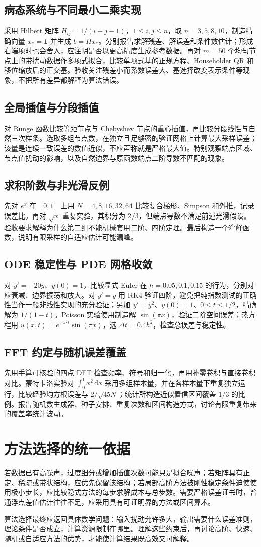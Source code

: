 \subsection{病态系统与不同最小二乘实现}
采用 Hilbert 矩阵 $H_{ij}=1/(i+j-1)$，$1\le i,j\le n$，取 $n=3,5,8,10$，制造精确向量 $x_*=\boldsymbol1$ 并生成 $b=Hx_*$。分别报告求解残差、解误差和条件数估计；形成右端项时也会舍入，应注明是否以更高精度生成参考数据。再对 $m=50$ 个均匀节点上的带扰动数据作多项式拟合，比较单项式基的正规方程、Householder QR 和移位缩放后的正交基。验收关注残差小而系数误差大、基选择改变表示条件等现象，不把所有差异都解释为算法错误。

\subsection{全局插值与分段插值}
对 Runge 函数比较等距节点与 Chebyshev 节点的重心插值，再比较分段线性与自然三次样条。选取多组节点数，在独立且足够密的验证网格上计算最大采样误差；该量是连续一致误差的数值近似，不应声称就是严格最大值。特别观察端点区域、节点值扰动的影响，以及自然边界与原函数端点二阶导数不匹配的现象。

\subsection{求积阶数与非光滑反例}
先对 $e^x$ 在 $[0,1]$ 上用 $N=4,8,16,32,64$ 比较复合梯形、Simpson 和外推，记录误差比。再对 $\sqrt x$ 重复实验，其积分为 $2/3$，但端点导数不满足前述光滑假设。验收要求解释为什么第二组不能机械套用二阶、四阶定理。最后构造一个窄峰函数，说明有限采样的自适应估计可能漏峰。

\subsection{ODE 稳定性与 PDE 网格收敛}
对 $y'=-20y$、$y(0)=1$，比较显式 Euler 在 $h=0.05,0.1,0.15$ 的行为，分别对应衰减、边界振荡和放大。对 $y'=y$ 用 RK4 验证四阶，避免把纯指数测试的正确性当作一般非线性实现的充分验证；另加 $y'=y^2$、$y(0)=1$、$0\le t\le1/2$，精确解为 $1/(1-t)$。Poisson 实验使用制造解 $\sin(\pi x)$，验证二阶空间误差；热方程用 $u(x,t)=e^{-\pi^2t}\sin(\pi x)$，选 $\Delta t=0.4h^2$，检查总误差与稳定性。

\subsection{FFT 约定与随机误差覆盖}
先用手算可核验的四点 DFT 检查频率、符号和归一化，再用补零卷积与直接卷积对比。蒙特卡洛实验对 $\int_0^1x^2\,\mathrm dx$ 采用多组样本量，并在各样本量下重复独立运行，比较经验均方根误差与 $2/\sqrt{45N}$；统计所构造近似置信区间覆盖 $1/3$ 的比例。报告随机数生成器、种子安排、重复次数和区间构造方式，讨论有限重复带来的覆盖率统计波动。

\section{方法选择的统一依据}
若数据已有高噪声，过度细分或增加插值次数可能只是拟合噪声；若矩阵具有正定、稀疏或带状结构，应优先保留该结构；若局部高阶方法被刚性稳定条件迫使使用极小步长，应比较隐式方法的每步求解成本与总步数。需要严格误差证书时，普通浮点差值估计往往不足，应采用具有可证明界的方法或区间算术。

算法选择最终应返回具体数学问题：输入扰动允许多大，输出需要什么误差准则，理论条件是否成立，计算资源限制在哪里。理解这些约束后，再讨论高阶、快速、随机或自适应方法的优势，才能使计算结果既高效又可解释。

